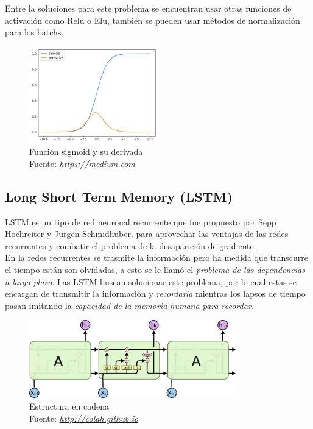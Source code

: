 Entre la soluciones para este problema se encuentran usar otras funciones de activación como Relu o Elu, también se pueden usar métodos de normalización para los batchs.
\begin{figure}[H]
	\centering
	\includegraphics[width=0.5\textwidth]{Figures/sigmoid.png}
	\caption{Función sigmoid y su derivada \\ Fuente:  \href{https://cdn-images-1.medium.com/max/960/1*XB5c4rTCSeFQrK0aFC5IVw.png}{\textit{https://medium.com}}}
	\label{}
\end{figure}

\subsection{Long Short Term Memory (LSTM)}

LSTM es un tipo de red neuronal recurrente que fue propuesto por Sepp Hochreiter y Jurgen Schmidhuber.\cite{LSTM} para aprovechar las ventajas de las redes recurrentes y combatir el problema de la desaparición de gradiente.\\ En la redes recurrentes se trasmite la información pero ha medida que transcurre el tiempo están son olvidadas, a esto se le llamó el \textit{problema de las dependencias a largo plazo}. Las LSTM buscan solucionar este problema, por lo cual estas se encargan de transmitir la información y \textit{recordarla} mientras los lapsos de tiempo pasan imitando la \textit{capacidad de la memoria humana para recordar.}


\begin{figure}[H]
	\centering
	\includegraphics[width=0.8\textwidth]{Figures/LSTM-chain.png}
	\caption{Estructura en cadena \\ Fuente:  \href{http://colah.github.io/posts/2015-08-Understanding-LSTMs/}{\textit{http://colah.github.io}}}
	\label{}
\end{figure}


